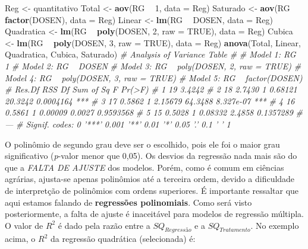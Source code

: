 \documentclass[
]{book}
\newenvironment{Shaded}{\begin{snugshade}}{\end{snugshade}}
\newcommand{\CommentTok}[1]{\textcolor[rgb]{0.56,0.35,0.01}{\textit{#1}}}
\newcommand{\DataTypeTok}[1]{\textcolor[rgb]{0.13,0.29,0.53}{#1}}
\newcommand{\DecValTok}[1]{\textcolor[rgb]{0.00,0.00,0.81}{#1}}
\newcommand{\KeywordTok}[1]{\textcolor[rgb]{0.13,0.29,0.53}{\textbf{#1}}}
\newcommand{\NormalTok}[1]{#1}
\newcommand{\OperatorTok}[1]{\textcolor[rgb]{0.81,0.36,0.00}{\textbf{#1}}}
\newcommand{\OtherTok}[1]{\textcolor[rgb]{0.56,0.35,0.01}{#1}}
\newcommand{\StringTok}[1]{\textcolor[rgb]{0.31,0.60,0.02}{#1}}
\begin{document}
\begin{Shaded}
\begin{Highlighting}[]
\NormalTok{Reg <-}\StringTok{ }\NormalTok{quantitativo}
\NormalTok{Total <-}\StringTok{ }\KeywordTok{aov}\NormalTok{(RG }\OperatorTok{~}\StringTok{ }\DecValTok{1}\NormalTok{, }\DataTypeTok{data =}\NormalTok{ Reg)}
\NormalTok{Saturado <-}\StringTok{ }\KeywordTok{aov}\NormalTok{(RG }\OperatorTok{~}\StringTok{ }\KeywordTok{factor}\NormalTok{(DOSEN), }\DataTypeTok{data =}\NormalTok{ Reg)}
\NormalTok{Linear <-}\StringTok{ }\KeywordTok{lm}\NormalTok{(RG }\OperatorTok{~}\StringTok{ }\NormalTok{DOSEN, }\DataTypeTok{data =}\NormalTok{ Reg)}
\NormalTok{Quadratica <-}\StringTok{ }\KeywordTok{lm}\NormalTok{(RG }\OperatorTok{~}\StringTok{ }\KeywordTok{poly}\NormalTok{(DOSEN, }\DecValTok{2}\NormalTok{, }\DataTypeTok{raw =} \OtherTok{TRUE}\NormalTok{), }\DataTypeTok{data =}\NormalTok{ Reg)}
\NormalTok{Cubica <-}\StringTok{ }\KeywordTok{lm}\NormalTok{(RG }\OperatorTok{~}\StringTok{ }\KeywordTok{poly}\NormalTok{(DOSEN, }\DecValTok{3}\NormalTok{, }\DataTypeTok{raw =} \OtherTok{TRUE}\NormalTok{), }\DataTypeTok{data =}\NormalTok{ Reg)}
\KeywordTok{anova}\NormalTok{(Total, Linear, Quadratica, Cubica, Saturado) }
\CommentTok{# Analysis of Variance Table}
\CommentTok{# }
\CommentTok{# Model 1: RG ~ 1}
\CommentTok{# Model 2: RG ~ DOSEN}
\CommentTok{# Model 3: RG ~ poly(DOSEN, 2, raw = TRUE)}
\CommentTok{# Model 4: RG ~ poly(DOSEN, 3, raw = TRUE)}
\CommentTok{# Model 5: RG ~ factor(DOSEN)}
\CommentTok{#   Res.Df    RSS Df Sum of Sq       F    Pr(>F)    }
\CommentTok{# 1     19 3.4242                                   }
\CommentTok{# 2     18 2.7430  1   0.68121 20.3242 0.0004164 ***}
\CommentTok{# 3     17 0.5862  1   2.15679 64.3488 8.327e-07 ***}
\CommentTok{# 4     16 0.5861  1   0.00009  0.0027 0.9593568    }
\CommentTok{# 5     15 0.5028  1   0.08332  2.4858 0.1357289    }
\CommentTok{# ---}
\CommentTok{# Signif. codes:  0 '***' 0.001 '**' 0.01 '*' 0.05 '.' 0.1 ' ' 1}
\end{Highlighting}
\end{Shaded}

O polinômio  de segundo grau deve ser o escolhido, pois ele foi o maior grau significativo (\emph{p}-valor menor que 0,05). Os desvios da regressão nada mais são do que a \emph{FALTA DE AJUSTE}  dos modelos. Porém, como é comum em ciências agrárias, ajusta-se apenas polinômios até a terceira ordem, devido a dificuldade de interpretção de polinômios com ordens superiores. É importante ressaltar que aqui estamos falando de \textbf{regressões polinomiais}. Como será visto posteriormente, a falta de ajuste é inaceitável para modelos de regressão múltipla. O valor de \(R^2\) é dado pela razão entre a \(SQ_{Regressão}\) e a \(SQ_{Tratamento}\). No exemplo acima, o \(R^2\) da regressão quadrática (selecionada) é:
\end{document}
